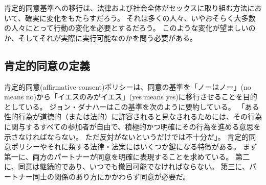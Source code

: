 \documentclass[paper=a4,book,openany]{jlreq}
\newcommand{\ig}[1]{}           %
\begin{document}
肯定的同意基準への移行は、法律および社会全体がセックスに取り組む方法において、確実に変化をもたらすだろう。
それは多くの人々、いやおそらく大多数の人々にとって行動の変化を必要とするだろう。
このような変化が望ましいのか、そしてそれが実際に実行可能なのかを問う必要がある。

\subsection{肯定的同意の定義}

肯定的同意(affirmative consent)ポリシーは、同意の基準を「ノーはノー」(no means no)から「イエスのみがイエス」(yes means yes)に移行させることを目的としている。
ジョン・ダナハー\ig{John Danaher}はこの基準を次のように要約している。
「ある性的行為が道徳的（または法的）に許容されると見なされるためには、その行為に関与するすべての参加者が自由で、積極的かつ明確にその行為を進める意思を示さなければならない。
ただ反対がないというだけでは不十分だ」\citep{danaher14:_yes_means_yes}。
肯定的同意ポリシーやそれに類する法律・法案にはいくつか鍵になる特徴がある。
まず第一に、両方のパートナーが同意を明確に表現することを求めている。
第二に、同意は継続的であり、いつでも撤回可能でなければならない。
第三に、パートナー同士の関係のあり方にかかわらず同意が必要だ。
\end{document}

